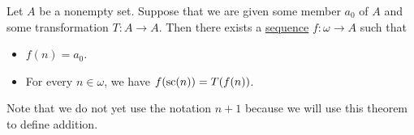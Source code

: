 \begin{theorem}\label{thm:omega_recursion}
  Let \( A \) be a nonempty set. Suppose that we are given some member \( a_0 \) of \( A \) and some transformation \( T: A \to A \). Then there exists a \hyperref[def:sequence]{sequence} \( f: \omega \to A \) such that
  \begin{itemize}
    \item \( f(n) = a_0 \).
    \item For every \( n \in \omega \), we have \( f(\op{sc}(n)) = T(f(n)) \).
  \end{itemize}
\end{theorem}
\begin{comments}
  \item Note that we do not yet use the notation \( n + 1 \) because we will use this theorem to define addition.
\end{comments}
